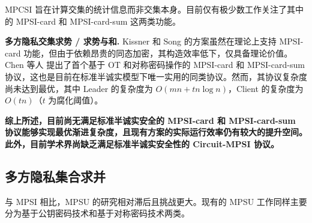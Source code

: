 MPCSI 旨在计算交集的统计信息而非交集本身。目前仅有极少数工作关注了其中的 MPSI-card 和 MPSI-card-sum 这两类功能。

\begin{trivlist}
\item \textbf{多方隐私交集求势 / 求势与和.} 
Kissner 和 Song \cite{KS-CRYPTO-2005} 的方案虽然在理论上支持 MPSI-card 功能，但由于依赖昂贵的同态加密，其构造效率低下，仅具备理论价值。Chen 等人 \cite{ChenDGB22} 提出了首个基于 OT 和对称密码操作的 MPSI-card 和 MPSI-card-sum 协议，这也是目前在标准半诚实模型下唯一实用的同类协议。然而，其协议复杂度尚未达到最优，其中 Leader 的复杂度为 $O(mn + tn \log n)$，Client 的复杂度为 $O(tn)$（$t$ 为腐化阈值）。
\end{trivlist}

\textbf{综上所述，目前尚无满足标准半诚实安全的 MPSI-card 和 MPSI-card-sum 协议能够实现最优渐进复杂度，且现有方案的实际运行效率仍有较大的提升空间。此外，目前学术界尚缺乏满足标准半诚实安全性的 Circuit-MPSI 协议。}

\subsection{多方隐私集合求并}

与 MPSI 相比，MPSU 的研究相对滞后且挑战更大。现有的 MPSU 工作同样主要分为基于公钥密码技术和基于对称密码技术两类。

